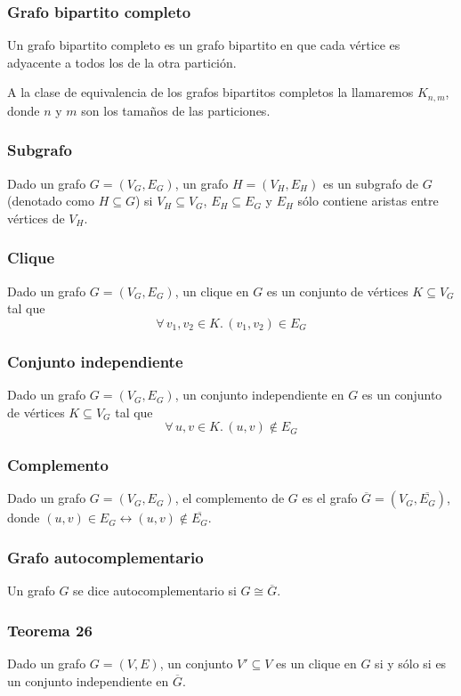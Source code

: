 \begin{multicols}{2}
    \subsubsection*{Grafo bipartito completo}
    Un grafo bipartito completo es un grafo bipartito en que cada vértice es adyacente a todos los de la otra partición. \p
    
    A la clase de equivalencia de los grafos bipartitos completos la llamaremos $K_{n,m}$, donde $n$ y $m$ son los tamaños de las particiones.
    
    \subsubsection*{Subgrafo}
    Dado un grafo $G = (V_G, E_G)$, un grafo $H = (V_H, E_H)$ es un subgrafo de $G$ (denotado como $H \subseteq G$) si $V_H \subseteq V_G$, $E_H \subseteq E_G$ y $E_H$ sólo contiene aristas entre vértices de $V_H$.
    
    \subsubsection*{Clique}
    Dado un grafo $G = (V_G, E_G)$, un clique en $G$ es un conjunto de vértices $K \subseteq V_G$ tal que
    $$\forall\,v_1, v_2 \in K.\,(v_1, v_2) \in E_G$$
    
    \subsubsection*{Conjunto independiente}
    Dado un grafo $G = (V_G, E_G)$, un conjunto independiente en $G$ es un conjunto de vértices $K \subseteq V_G$ tal que
    $$
    \forall\,u,v \in K.\, (u,v) \notin E_G
    $$
    
    \subsubsection*{Complemento}
    Dado un grafo $G = (V_G, E_G)$, el complemento de $G$ es el grafo $\overline{G} = (V_G, \overline{E_G})$, donde $(u,v) \in E_G \leftrightarrow (u,v) \notin \overline{E_G}$.
    
    \subsubsection*{Grafo autocomplementario}
    Un grafo $G$ se dice autocomplementario si $G \cong \overline{G}$.
    
    \subsubsection*{Teorema 26}
    Dado un grafo $G = (V,E)$, un conjunto $V' \subseteq V$ es un clique en $G$ si y sólo si es un conjunto independiente en $\overline{G}$.
    

\end{multicols}
